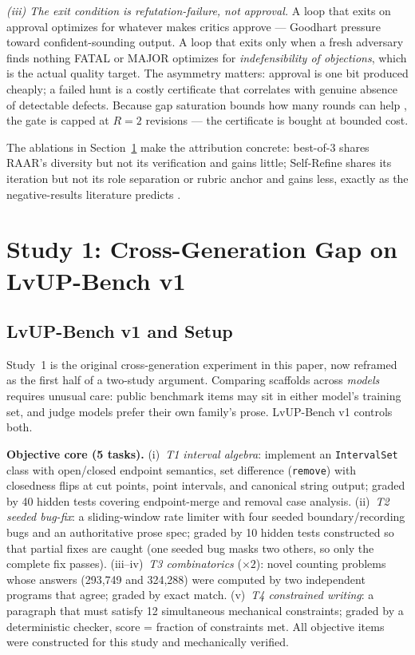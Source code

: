 \documentclass[journal]{IEEEtran}
\newcommand{\method}{RAAR}
\newcommand{\bench}{LvUP-Bench}
\begin{document}
\emph{(iii) The exit condition is refutation-failure, not approval.} A loop
that exits on approval optimizes for whatever makes critics approve ---
Goodhart pressure toward confident-sounding output. A loop that exits only
when a fresh adversary finds nothing FATAL or MAJOR optimizes for
\emph{indefensibility of objections}, which is the actual quality target.
The asymmetry matters: approval is one bit produced cheaply; a failed hunt
is a costly certificate that correlates with genuine absence of detectable
defects. Because gap saturation bounds how many rounds can help
\cite{song2024}, the gate is capped at $R{=}2$ revisions --- the certificate
is bought at bounded cost.

The ablations in Section~\ref{sec:results} make the attribution concrete:
best-of-3 shares \method{}'s diversity but not its verification and gains
little; Self-Refine shares its iteration but not its role separation or
rubric anchor and gains less, exactly as the negative-results literature
predicts \cite{huang2023, stechly2024}.

\section{Study 1: Cross-Generation Gap on \bench{} v1}
\label{sec:results}
\label{sec:study1}

\subsection{\bench{} v1 and Setup}
\label{sec:bench}
\label{sec:setup}
Study~1 is the original cross-generation experiment in this paper, now
reframed as the first half of a two-study argument. Comparing scaffolds
across \emph{models} requires unusual care: public benchmark items may sit
in either model's training set, and judge models prefer their own family's
prose. \bench{} v1 controls both.

\textbf{Objective core (5 tasks).} (i)~\emph{T1 interval algebra}: implement
an \texttt{IntervalSet} class with open/closed endpoint semantics, set
difference (\texttt{remove}) with closedness flips at cut points, point
intervals, and canonical string output; graded by 40 hidden tests covering
endpoint-merge and removal case analysis. (ii)~\emph{T2 seeded bug-fix}: a
sliding-window rate limiter with four seeded boundary/recording bugs and an
authoritative prose spec; graded by 10 hidden tests constructed so that
partial fixes are caught (one seeded bug masks two others, so only the
complete fix passes). (iii--iv)~\emph{T3 combinatorics} ($\times 2$): novel
counting problems whose answers (293{,}749 and 324{,}288) were computed by
two independent programs that agree; graded by exact match.
(v)~\emph{T4 constrained writing}: a paragraph that must satisfy 12
simultaneous mechanical constraints; graded by a deterministic checker,
score = fraction of constraints met. All objective items were constructed
for this study and mechanically verified.
\end{document}
